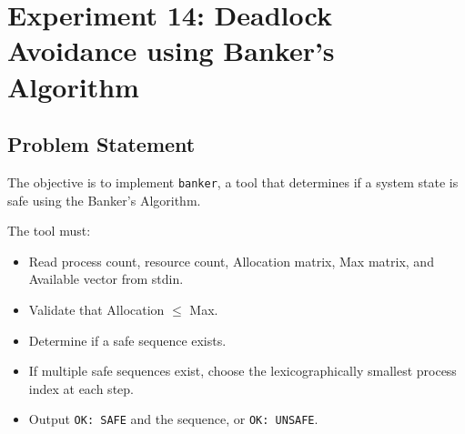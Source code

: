 
\section{Experiment 14: Deadlock Avoidance using Banker's Algorithm}

\subsection{Problem Statement}
The objective is to implement \texttt{banker}, a tool that determines if a system state is safe using the Banker's Algorithm.

The tool must:
\begin{itemize}
    \item Read process count, resource count, Allocation matrix, Max matrix, and Available vector from stdin.
    \item Validate that Allocation $\le$ Max.
    \item Determine if a safe sequence exists.
    \item If multiple safe sequences exist, choose the lexicographically smallest process index at each step.
    \item Output \verb|OK: SAFE| and the sequence, or \verb|OK: UNSAFE|.
\end{itemize}

